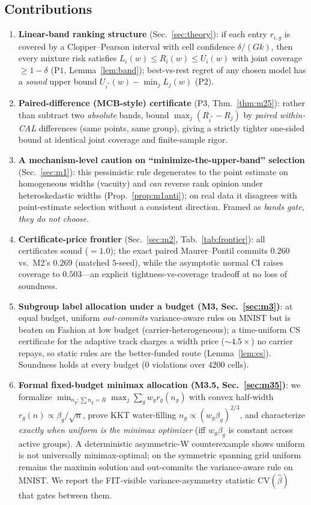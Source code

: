 \documentclass{article}
\begin{document}
\subsection{Contributions}
\begin{enumerate}
\item \textbf{Linear-band ranking structure} (Sec.~\ref{sec:theory}): if each entry
$r_{i,g}$ is covered by a Clopper--Pearson interval with cell confidence
$\delta/(G k)$, then every mixture risk satisfies $L_i(w)\le R_i(w)\le U_i(w)$ with joint
coverage $\ge 1-\delta$ ($\mathrm{P1}$, Lemma~\ref{lem:band}); best-vs-rest regret of any
chosen model has a \emph{sound} upper bound $U_{i^*}(w)-\min_j L_j(w)$ ($\mathrm{P2}$).
\item \textbf{Paired-difference (MCB-style) certificate} ($\mathrm{P3}$, Thm.~\ref{thm:m25}):
rather than subtract two \emph{absolute} bands, bound $\max_j(R_{i^*}-R_j)$ by
\emph{paired within-CAL} differences (same points, same group), giving a strictly tighter
one-sided bound at identical joint coverage and finite-sample rigor.
\item \textbf{A mechanism-level caution on ``minimize-the-upper-band'' selection}
(Sec.~\ref{sec:m1}): this pessimistic rule degenerates to the point estimate on homogeneous
widths (vacuity) and \emph{can} reverse rank opinion under heteroskedastic widths
(Prop.~\ref{prop:m1anti}); on real data it disagrees with point-estimate selection without a
consistent direction. Framed as \emph{bands gate, they do not choose}.
\item \textbf{Certificate-price frontier} (Sec.~\ref{sec:m2}, Tab.~\ref{tab:frontier}): all
certificates sound ($=1.0$); the exact paired Maurer--Pontil commits $0.260$ vs.\ M2's $0.269$
(matched $5$-seed), while the asymptotic normal CI raises coverage to $0.503$---an explicit
tightness-vs-coverage tradeoff at no loss of soundness.
\item \textbf{Subgroup label allocation under a budget (M3, Sec.~\ref{sec:m3})}: at equal
budget, uniform \emph{out-commits} variance-aware rules on MNIST but is beaten on Fashion at
low budget (carrier-heterogeneous); a time-uniform CS certificate for the adaptive track
charges a width price ($\sim4.5\times$) no carrier repays, so static rules are the
better-funded route (Lemma~\ref{lem:cs}). Soundness holds at every budget (0 violations over
$4200$ cells).
\item \textbf{Formal fixed-budget minimax allocation (M3.5, Sec.~\ref{sec:m35})}: we
formalize $\min_{n_g:\sum n_g=R}\max_j\sum_g w_g r_g(n_g)$ with convex half-width
$r_g(n)\propto\beta_g/\sqrt n$, prove KKT water-filling $n_g\propto(w_g\beta_g)^{2/3}$, and
characterize \emph{exactly when uniform is the minimax optimizer} (iff $w_g\beta_g$ is
constant across active groups). A deterministic asymmetric-W counterexample shows uniform is
not universally minimax-optimal; on the symmetric spanning grid uniform remains the maximin
solution and out-commits the variance-aware rule on MNIST. We report the FIT-visible
variance-asymmetry statistic $\mathrm{CV}(\hat\beta)$ that gates between them.
\end{enumerate}
\end{document}
